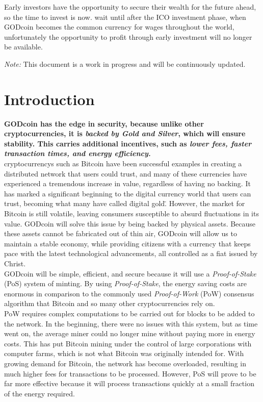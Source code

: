 \documentclass[12pt,a4paper]{article}
\begin{document}
  Early investors have the opportunity to secure their wealth for the future
  ahead, so the time to invest is now. wait until after the ICO investment
  phase, when GODcoin becomes the common currency for wages throughout the
  world, unfortunately the opportunity to profit through early investment will
  no longer be available.

  \medskip
  \textit{Note:} This document is a work in progress and will be continuously
  updated.

  \newpage
  \tableofcontents
  \newpage

  \section{Introduction}
  \textbf{GODcoin has the edge in security, because unlike other
  cryptocurrencies, it is \textit{backed by Gold and Silver}, which will ensure
  stability. This carries additional incentives, such as \textit{lower fees,
  faster transaction times, and energy efficiency.}}\\

  \Glspl{cryptocurrency} such as Bitcoin have been successful examples in
  creating a distributed \gls{network} that users could trust, and many of these
  currencies have experienced a tremendous increase in value, regardless of
  having no backing. It has marked a significant beginning to the digital
  currency world that users can trust, becoming what many have called \"digital
  gold\". However, the market for Bitcoin is still \gls{volatile}, leaving
  consumers susceptible to absurd fluctuations in its value. GODcoin will solve
  this issue by being backed by physical assets. Because these assets cannot be
  fabricated out of thin air, GODcoin will allow us to maintain a stable
  economy, while providing citizens with a currency that keeps pace with the
  latest technological advancements, all controlled as a fiat issued by
  Christ.\\

  GODcoin will be simple, efficient, and secure because it will use a
  \textit{\gls{Proof-of-Stake}} (PoS) system of \gls{minting}. By
  using \textit{Proof-of-Stake}, the energy saving costs are enormous in
  comparison to the commonly used \textit{\gls{Proof-of-Work}} (PoW)
  consensus algorithm that Bitcoin and so many other cryptocurrencies rely on.\\

  PoW requires complex computations to be carried out for \gls{blocks} to be
  added to the network. In the beginning, there were no issues with this system,
  but as time went on, the average miner could no longer mine without paying
  more in energy costs. This has put Bitcoin \gls{mining} under the control of
  large corporations with computer farms, which is not what Bitcoin was
  originally intended for. With growing demand for Bitcoin, the network has
  become overloaded, resulting in much higher fees for transactions to be
  processed. However, PoS will prove to be far more effective because it will
  process transactions quickly at a small fraction of the energy required.\\
\end{document}
